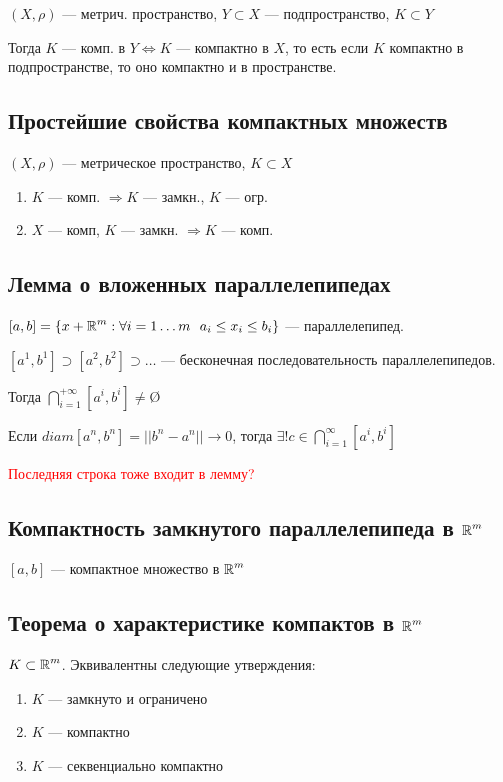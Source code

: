 $(X,\rho)$ --- метрич. пространство, $Y\subset X$ --- подпространство, $K\subset Y$

Тогда $K$ --- комп. в $Y \Leftrightarrow K$ --- компактно в $X$, то есть если $K$ компактно в подпространстве, то оно компактно и в пространстве.

\subsection{Простейшие свойства компактных множеств}

$(X, \rho)$ --- метрическое пространство, $K\subset X$

\begin{enumerate}
    \item $K$ --- комп. $\Rightarrow K$ --- замкн., $K$ --- огр.
    \item $X$ --- комп, $K$ --- замкн. $\Rightarrow K$ --- комп. 
\end{enumerate}

\subsection{Лемма о вложенных параллелепипедах}

$[a, b] = \{x+\R^m: \forall i=1\ldots m \ \ a_i\leq x_i\leq b_i\}$ --- параллелепипед.

$[a^1, b^1]\supset[a^2, b^2]\supset\ldots$ --- бесконечная последовательность параллелепипедов.

Тогда $\bigcap\limits_{i=1}^{+\infty}[a^i, b^i]\not=$\O

Если $diam[a^n, b^n]=||b^n-a^n||\to 0$, тогда $\exists! c\in\bigcap\limits_{i=1}^\infty[a^i, b^i]$

\textcolor{red}{Последняя строка тоже входит в лемму?}

\subsection{Компактность замкнутого параллелепипеда в $\operatorname*{\mathbb{R}}^m$}

$[a,b]$ --- компактное множество в $\operatorname*{\mathbb{R}}^m$

\subsection{Теорема о характеристике компактов в $\operatorname*{\mathbb{R}}^m$}

$K\subset \operatorname*{\mathbb{R}}^m$. Эквивалентны следующие утверждения:\begin{enumerate}
    \itemsep-0.5em
    \item $K$ --- замкнуто и ограничено
    \item $K$ --- компактно
    \item $K$ --- секвенциально компактно
\end{enumerate}

